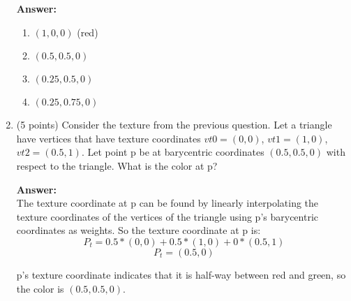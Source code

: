 \documentclass[12pt]{letter}
\begin{document}
\begin{enumerate}
	\textbf{Answer:}
	\begin{enumerate}
		\item $(1, 0, 0)$ (red)
		\item $(0.5, 0.5, 0)$
		\item $(0.25, 0.5, 0)$
		\item $(0.25, 0.75, 0)$
	\end{enumerate}

	\item (5 points)
	Consider the texture from the previous question.
	Let a triangle have vertices that have texture coordinates $vt0 = (0, 0)$, $vt1 = (1, 0)$, $vt2 = (0.5, 1)$. 
	Let point p be at barycentric coordinates $(0.5, 0.5, 0)$ with respect to the triangle.
	What is the color at p?
	
	\textbf{Answer:} \\
	The texture coordinate at p can be found by linearly interpolating the texture coordinates of the vertices of the triangle using p's barycentric coordinates as weights.
	So the texture coordinate at p is:
	$$ P_t = 0.5 * (0, 0) + 0.5 * (1, 0) + 0 * (0.5, 1) $$
	$$ P_t = (0.5, 0) $$
	
	p's texture coordinate indicates that it is half-way between red and green, so the color is $(0.5, 0.5, 0)$.
	
	
\end{enumerate}
\end{document}
